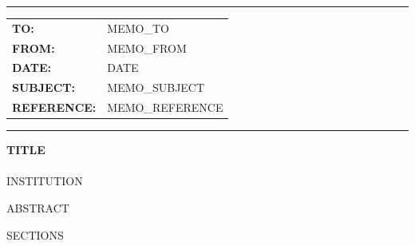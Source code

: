 \documentclass[11pt,letterpaper]{article}
\begin{document}
\thispagestyle{empty}

\begin{center}
{\color{rulecolor}\rule{\textwidth}{1.5pt}}
\end{center}

\vspace{0.3cm}

\begin{tabularx}{\textwidth}{@{}l X@{}}
\textsf{\textbf{TO:}}        & {{MEMO_TO}} \\[4pt]
\textsf{\textbf{FROM:}}      & {{MEMO_FROM}} \\[4pt]
\textsf{\textbf{DATE:}}      & {{DATE}} \\[4pt]
\textsf{\textbf{SUBJECT:}}   & {{MEMO_SUBJECT}} \\[4pt]
\textsf{\textbf{REFERENCE:}} & {{MEMO_REFERENCE}} \\
\end{tabularx}

\vspace{0.3cm}

\begin{center}
{\color{rulecolor}\rule{\textwidth}{1.5pt}}
\end{center}

\vspace{0.5cm}

\begin{center}
{\LARGE\bfseries\sffamily\color{navyheading} {{TITLE}}}\\[0.4cm]
{\large{} \\ {{INSTITUTION}}}
\end{center}

\vspace{0.5cm}

{{ABSTRACT}}

\tableofcontents
\newpage

{{SECTIONS}}
\end{document}
